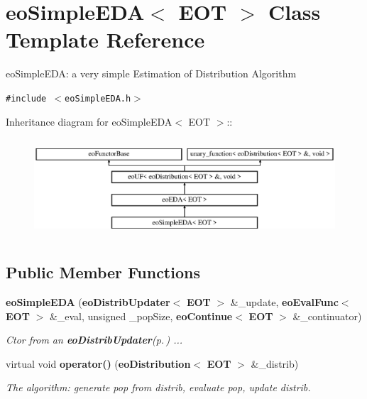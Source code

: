 \section{eo\-Simple\-EDA$<$ EOT $>$ Class Template Reference}
\label{classeo_simple_e_d_a}
eo\-Simple\-EDA: a very simple Estimation of Distribution Algorithm  


{\tt \#include $<$eo\-Simple\-EDA.h$>$}

Inheritance diagram for eo\-Simple\-EDA$<$ EOT $>$::\begin{figure}[H]
\begin{center}
\leavevmode
\includegraphics[height=3.70861cm]{classeo_simple_e_d_a}
\end{center}
\end{figure}
\subsection*{Public Member Functions}
\begin{CompactItemize}
\item 
{\bf eo\-Simple\-EDA} ({\bf eo\-Distrib\-Updater}$<$ {\bf EOT} $>$ \&\_\-update, {\bf eo\-Eval\-Func}$<$ {\bf EOT} $>$ \&\_\-eval, unsigned \_\-pop\-Size, {\bf eo\-Continue}$<$ {\bf EOT} $>$ \&\_\-continuator)
\begin{CompactList}\small\item\em Ctor from an {\bf eo\-Distrib\-Updater}{\rm (p.\,\pageref{classeo_distrib_updater})} ... \item\end{CompactList}\item 
virtual void {\bf operator()} ({\bf eo\-Distribution}$<$ {\bf EOT} $>$ \&\_\-distrib)\label{classeo_simple_e_d_a_a1}

\begin{CompactList}\small\item\em The algorithm: generate pop from distrib, evaluate pop, update distrib. \item\end{CompactList}\end{CompactItemize}
